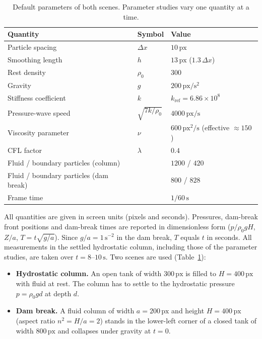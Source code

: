 \begin{table}[tp]
    \centering
    \caption{Default parameters of both scenes. Parameter studies vary one
    quantity at a time.}
    \label{tab:setup}
    \begin{tabular}{lll}
        \toprule
        Quantity & Symbol & Value \\
        \midrule
        Particle spacing & $\Delta x$ & $10\,\mathrm{px}$ \\
        Smoothing length & $h$ & $13\,\mathrm{px}$ ($1.3\,\Delta x$) \\
        Rest density & $\rho_0$ & $300$ \\
        Gravity & $g$ & $200\,\mathrm{px/s^2}$ \\
        Stiffness coefficient & $k$ & $k_\mathrm{ref} = 6.86\times10^{8}$ \\
        Pressure-wave speed & $\sqrt{7k/\rho_0}$ & $4000\,\mathrm{px/s}$ \\
        Viscosity parameter & $\nu$ & $600\,\mathrm{px^2/s}$ (effective $\approx 150$) \\
        CFL factor & $\lambda$ & $0.4$ \\
        Fluid / boundary particles (column) & & $1200$ / $420$ \\
        Fluid / boundary particles (dam break) & & $800$ / $828$ \\
        Frame time & & $1/60\,\mathrm{s}$ \\
        \bottomrule
    \end{tabular}
\end{table}

All quantities are given in screen units (pixels and seconds). Pressures,
dam-break front positions and dam-break times are reported in dimensionless form
($p/\rho_0 g H$, $Z/a$, $T = t\sqrt{g/a}$). Since $g/a = 1\,\mathrm{s^{-2}}$ in
the dam break, $T$ equals $t$ in seconds. All measurements in the settled
hydrostatic column, including those of the parameter studies, are taken over
$t = 8$--$10\,\mathrm{s}$. Two scenes are used
(Table~\ref{tab:setup}):
\begin{itemize}
    \item \textbf{Hydrostatic column.} An open tank of width $300\,\mathrm{px}$ is
          filled to $H = 400\,\mathrm{px}$ with fluid at rest. The column has to
          settle to the hydrostatic pressure $p = \rho_0 g d$ at depth $d$.
    \item \textbf{Dam break.} A fluid column of width $a = 200\,\mathrm{px}$ and
          height $H = 400\,\mathrm{px}$ (aspect ratio $n^2 = H/a = 2$) stands in
          the lower-left corner of a closed tank of width $800\,\mathrm{px}$ and
          collapses under gravity at $t = 0$.
\end{itemize}
